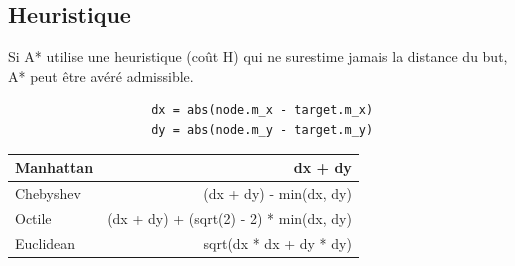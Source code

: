 \documentclass[11pt]{beamer}
\begin{document}
	\subsection{Heuristique}
		\begin{frame}[fragile]
			Si A* utilise une heuristique (coût H) qui ne surestime jamais la distance du but, A* peut être avéré admissible.
			\vspace{4mm}
			\begin{small}
				\begin{lstlisting}
					dx = abs(node.m_x - target.m_x)
        			dy = abs(node.m_y - target.m_y)
				\end{lstlisting}
			\end{small}	
			\vspace{4mm}
			\begin{center}	
				\begin{tabular}{l|r}
					\hline
					Manhattan & dx + dy\\
					\hline
					Chebyshev & (dx + dy) - min(dx, dy)\\
					\hline
					Octile & (dx + dy) + (sqrt(2) - 2) * min(dx, dy)\\
					\hline
					Euclidean & sqrt(dx * dx + dy * dy)\\
					\hline
				\end{tabular}
			\end{center}
		\end{frame}
		
\end{document}
